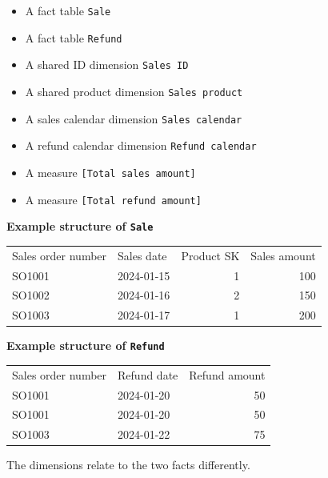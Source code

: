 \documentclass[10pt,openany,10pt]{book}
\providecommand{\tightlist}{%
  \setlength{\itemsep}{0pt}\setlength{\parskip}{0pt}}
\newcounter{none}
\let\podeToprule\toprule
\let\podeMidrule\midrule
\let\podeBottomrule\bottomrule
\renewcommand{\toprule}{\arrayrulecolor{pbiGrid}\podeToprule}
\renewcommand{\midrule}{\arrayrulecolor{pbiGrid}\podeMidrule}
\renewcommand{\bottomrule}{\arrayrulecolor{pbiGrid}\podeBottomrule}
\begin{document}
\begin{itemize}
\tightlist
\item
  A fact table \texttt{\textquotesingle{}Sale\textquotesingle{}}
\item
  A fact table \texttt{\textquotesingle{}Refund\textquotesingle{}}
\item
  A shared ID dimension
  \texttt{\textquotesingle{}Sales\ ID\textquotesingle{}}
\item
  A shared product dimension
  \texttt{\textquotesingle{}Sales\ product\textquotesingle{}}
\item
  A sales calendar dimension
  \texttt{\textquotesingle{}Sales\ calendar\textquotesingle{}}
\item
  A refund calendar dimension
  \texttt{\textquotesingle{}Refund\ calendar\textquotesingle{}}
\item
  A measure \texttt{{[}Total\ sales\ amount{]}}
\item
  A measure \texttt{{[}Total\ refund\ amount{]}}
\end{itemize}

\textbf{Example structure of
\texttt{\textquotesingle{}Sale\textquotesingle{}}}

{\def\LTcaptype{none} %
\begin{longtable}[]{@{}llrr@{}}
\toprule\noalign{}
Sales order number & Sales date & Product SK & Sales amount \\
\midrule\noalign{}
\endhead
\bottomrule\noalign{}
\endlastfoot
SO1001 & 2024-01-15 & 1 & 100 \\
SO1002 & 2024-01-16 & 2 & 150 \\
SO1003 & 2024-01-17 & 1 & 200 \\
\end{longtable}
}

\textbf{Example structure of
\texttt{\textquotesingle{}Refund\textquotesingle{}}}

{\def\LTcaptype{none} %
\begin{longtable}[]{@{}llr@{}}
\toprule\noalign{}
Sales order number & Refund date & Refund amount \\
\midrule\noalign{}
\endhead
\bottomrule\noalign{}
\endlastfoot
SO1001 & 2024-01-20 & 50 \\
SO1001 & 2024-01-20 & 50 \\
SO1003 & 2024-01-22 & 75 \\
\end{longtable}
}

The dimensions relate to the two facts differently.
\end{document}
